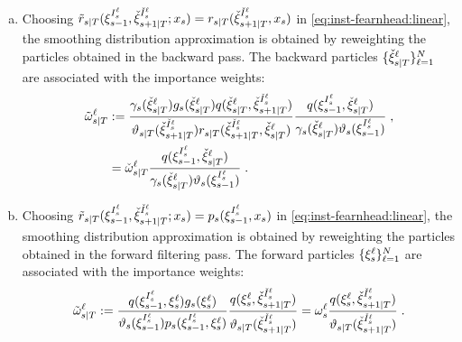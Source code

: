 \begin{enumerate}[(a)]
\item Choosing $\kiss[smooth]{s}{T}(\epart{s-1}{I_{s}^\ell},\ebackpart{s+1}{T}{\check{I}_{s}^\ell}; x_s) = \kiss{s}{T}(\ebackpart{s+1}{T}{\check{I}_{s}^\ell}, x_s)$ in \eqref{eq:inst-fearnhead:linear}, 
the smoothing distribution approximation is obtained by reweighting the particles obtained in the backward pass. The backward particles $\{{\check{\xi}}_{s|T}^{\ell}\}_{\ell=1}^N$ are associated with the importance weights:
\begin{align}
\nonumber
\smwght{s}{T}{\ell} &\eqdef \frac{ \gamma_s(\ebackpart{s}{T}{\ell})g_s(\ebackpart{s}{T}{\ell}) q(\ebackpart{s}{T}{\ell},\ebackpart{s+1}{T}{\check{I}_{s}^\ell})}{\adjfunc{s}{T}{\ebackpart{s+1}{T}{\check{I}_{s}^\ell}}
\kiss{s}{T}(\ebackpart{s+1}{T}{\check{I}_{s}^\ell}, \ebackpart{s}{T}{\ell})} \frac{q(\epart{s-1}{I_{s}^\ell},\ebackpart{s}{T}{\ell})}{\gamma_s(\ebackpart{s}{T}{\ell})\adjfuncforward{s}(\epart{s-1}{I_{s}^\ell})}\eqsp,\\
&= \ebackwght{s}{T}{\ell}\frac{q(\epart{s-1}{I_{s}^\ell},\ebackpart{s}{T}{\ell})}{\gamma_s(\ebackpart{s}{T}{\ell})\adjfuncforward{s}(\epart{s-1}{I_{s}^\ell})}\eqsp.\label{eq:weight-bdm:linear:bkd}
\end{align}
\item Choosing $\kiss[smooth]{s}{T}(\epart{s-1}{I_{s}^\ell},\ebackpart{s+1}{T}{\check{I}_{s}^\ell}; x_s) = \kissforward{s}{s}(\epart{s-1}{I_{s}^\ell}, x_s)$ in \eqref{eq:inst-fearnhead:linear}, the smoothing distribution approximation is obtained by reweighting the particles obtained in the forward filtering pass. The forward particles $\{\xi_{s}^{\ell}\}_{\ell=1}^N$ are associated with the importance weights:
\begin{equation}
\label{eq:weight-bdm:linear:fwd}
\smwght{s}{T}{\ell} \eqdef \frac{q(\epart{s-1}{I_{s}^\ell},\epart{s}{\ell}) g_s(\epart{s}{\ell}) }{\adjfuncforward{s}(\epart{s-1}{I_{s}^\ell})
\kissforward{s}{s}(\epart{s-1}{I_{s}^\ell}, \epart{s}{\ell}) } \frac{q(\epart{s}{\ell},\ebackpart{s+1}{T}{\check{I}_{s}^\ell})}{\adjfunc{s}{T}{\ebackpart{s+1}{T}{\check{I}_{s}^\ell}}} =  \ewght{s}{\ell}\frac{q(\epart{s}{\ell},\ebackpart{s+1}{T}{\check{I}_{s}^\ell})}{\adjfunc{s}{T}{\ebackpart{s+1}{T}{\check{I}_{s}^\ell}}}\eqsp.
\end{equation}
\end{enumerate}

